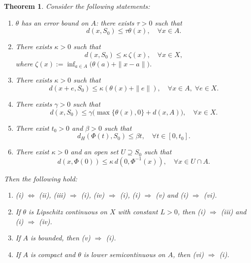 \documentclass[11pt]{article}
\newtheorem{theorem}{Theorem}[section]
\begin{document}
\begin{theorem} \label{XLWCJK}  Consider the following statements:
	\begin{enumerate}
		\item[(i)] $\theta$ has an error bound on $A$: there exists $\tau>0$ such that
		\begin{equation}\label{EBAQJ11} 
			d(x,S_0)\le\tau \theta(x), \quad  \forall x\in A.
		\end{equation}		 
		
		\item[(ii)]  There exists   \(\kappa > 0\) such that  
		$$			d(x, S_0) \le \kappa \, \zeta(x), \quad \forall x \in X, 		$$
		where  $\zeta(x) := \inf_{a \in A} \bigl( \theta(a) + \|x - a\| \bigr)$.
		
		\item[(iii)]  There exists \(\kappa > 0\) such that  
		\begin{equation}\label{EBkkQJ} 
			d(x+e, S_0) \le \kappa (\theta(x) + \|e\|),  \quad  \forall x \in A, \;    \forall e \in X.
		\end{equation}	
		
		\item[(iv)]  There exists  $\gamma>0$ such that  
		\begin{equation}\label{EBkXJ} 
			d(x,S_0)\le \gamma\bigl(\max\{\theta(x),0\}+d(x, A)\bigr),\quad \forall x\in X .
		\end{equation}	
		
		\item[(v)] There exist \(t_0 > 0\) and \(\beta > 0\) such that 
		\[
		d_H(\Phi(t), S_0) \le \beta t,  \quad  \forall t \in [0, t_0].
		\]
		
		\item[(vi)] There exist $\kappa>0$ and an open set $U\supseteq S_0$ such that \begin{equation}\label{EBkmJ} 
			d(x,\Phi(0))\le\kappa\,d(0,\Phi^{-1}(x)),       \quad  \forall       x\in U\cap A. 	
		\end{equation}	 
	\end{enumerate}
	Then the following hold:
	\begin{enumerate}
		\item      (i) $\Leftrightarrow$ (ii), (iii) $\Rightarrow$ (i), (iv) $\Rightarrow$ (i),  (i) $\Rightarrow$ (v) and (i) $\Rightarrow$ (vi). 
		\item  If $\theta$ is Lipschitz continuous on $X$ with constant $L>0$,
		then (i) $\Rightarrow$ (iii) and (i) $\Rightarrow$ (iv).
		\item  If $A$ is bounded, then (v) $\Rightarrow$ (i).
		\item  	If $A$ is compact  and $\theta$ is lower semicontinuous on $A$, then (vi) $\Rightarrow$ (i).  
	\end{enumerate}
\end{theorem}
\end{document}
